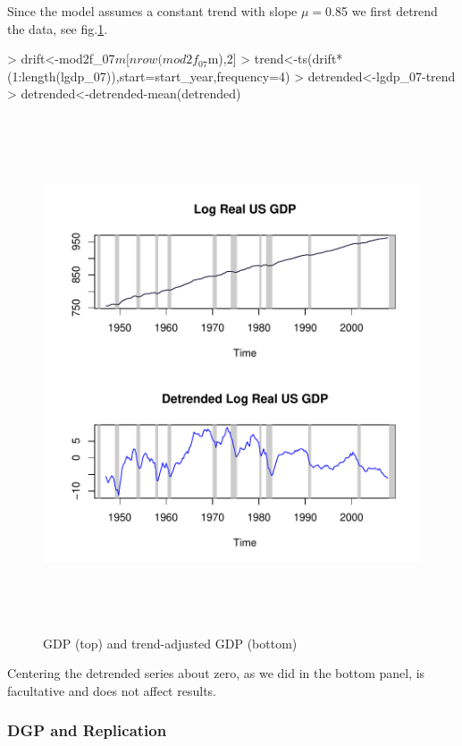 \documentclass[a4paper]{book}
\begin{document}
Since the model assumes a constant trend with slope $\mu=$0.85 we first detrend the data, see fig.\ref{z_us_real_log_gdp_detrended}.
\begin{Schunk}
\begin{Sinput}
> drift<-mod2f_07$m[nrow(mod2f_07$m),2]
> trend<-ts(drift*(1:length(lgdp_07)),start=start_year,frequency=4)
> detrended<-lgdp_07-trend
> detrended<-detrended-mean(detrended)
\end{Sinput}
\end{Schunk}
\begin{figure}[H]\begin{center}\includegraphics[height=6in, width=6in]{z_us_real_log_gdp_detrended}\caption{GDP (top) and trend-adjusted GDP (bottom)\label{z_us_real_log_gdp_detrended}}\end{center}\end{figure}Centering the detrended series about zero, as we did in the bottom panel, is facultative and does not affect results. 







\subsubsection{DGP and Replication}
\end{document}
